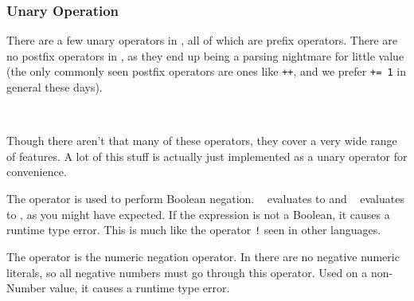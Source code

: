 \subsubsection{Unary Operation}
\label{sec:unaryop}

There are a few unary operators in \Poetry{}, all of which are prefix operators.
There are no postfix operators in \Trilogy{}, as they end up being a parsing
nightmare for little value (the only commonly seen postfix operators are
ones like \texttt{++}, and we prefer \texttt{+= 1} in general these days).

\begin{bnf*}
     \\
\end{bnf*}

Though there aren't that many of these operators, they cover a very wide
range of features. A lot of this stuff is actually just implemented as
a unary operator for convenience.

The  operator is used to perform Boolean negation. \texttt{~}
evaluates to  and \texttt{~} evaluates to , as
you might have expected. If the expression is not a Boolean, it causes a runtime type
error. This is much like the operator \texttt{!} seen in other languages.

\begin{figure}[H]
    \centering
    \parbox[t]{0.4\linewidth}{
        \begin{prooftree}
        \end{prooftree}
    }
    \parbox[t]{0.4\linewidth}{
        \begin{prooftree}
        \end{prooftree}
    }
\end{figure}

The operator \op{-} is the numeric negation operator. In \Trilogy{} there are no
negative numeric literals, so all negative numbers must go through this operator.
Used on a non-Number value, it causes a runtime type error.

